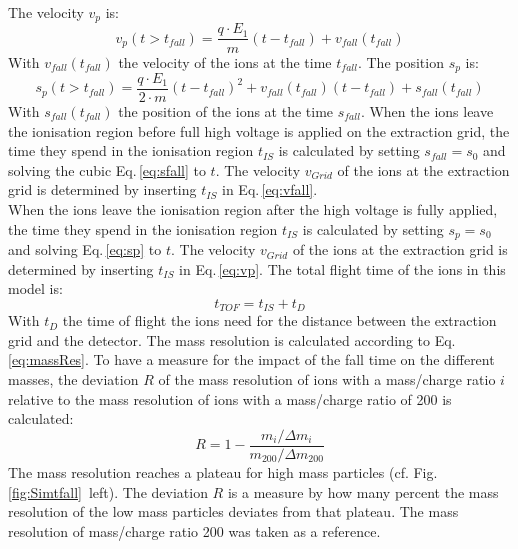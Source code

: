 	The velocity $v_{p}$ is:
	\begin{equation}
		v_{p}(t > t_{fall}) = \frac{q\cdot E_1}{m}(t-t_{fall}) + v_{fall}(t_{fall})
		\label{eq:vp}
	\end{equation}
	With $v_{fall}(t_{fall})$ the velocity of the ions at the time $t_{fall}$. The position $s_{p}$ is:
	\begin{equation}
		s_{p}(t > t_{fall}) = \frac{q\cdot E_1}{2\cdot m}(t-t_{fall})^2 + v_{fall}(t_{fall})(t-t_{fall}) + s_{fall}(t_{fall})
		\label{eq:sp}
	\end{equation}
	With $s_{fall}(t_{fall})$ the position of the ions at the time $s_{fall}$. When the ions leave the ionisation region before full high voltage is applied on the extraction grid, the time they spend in the ionisation region $t_{IS}$ is calculated by setting $s_{fall}=s_0$ and solving the cubic Eq.\,\eqref{eq:sfall} to $t$. The velocity $v_{Grid}$ of the ions at the extraction grid is determined by inserting $t_{IS}$ in Eq.\,\eqref{eq:vfall}.\\
	When the ions leave the ionisation region after the high voltage is fully applied, the time they spend in the ionisation region $t_{IS}$ is calculated by setting $s_{p}=s_0$ and solving Eq.\,\eqref{eq:sp} to $t$. The velocity $v_{Grid}$ of the ions at the extraction grid is determined by inserting $t_{IS}$ in Eq.\,\eqref{eq:vp}. The total flight time of the ions in this model is:
	\begin{equation}
		t_{TOF} = t_{IS} + t_D
	\end{equation}
	With $t_{D}$ the time of flight the ions need for the distance between the extraction grid and the detector. The mass resolution is calculated according to Eq.\,\eqref{eq:massRes}. To have a measure for the impact of the fall time on the different masses, the deviation $R$ of the mass resolution of ions with a mass/charge ratio $i$ relative to the mass resolution of ions with a mass/charge ratio of 200 is calculated:
	\begin{equation}
		R = 1 - \frac{m_i/\Delta m_i}{m_{200}/\Delta m_{200}}
	\end{equation}
	The mass resolution reaches a plateau for high mass particles (cf. Fig.\,\ref{fig:Simtfall}~left). The deviation $R$ is a measure by how many percent the mass resolution of the low mass particles deviates from that plateau. The mass resolution of mass/charge ratio 200 was taken as a reference.\\
